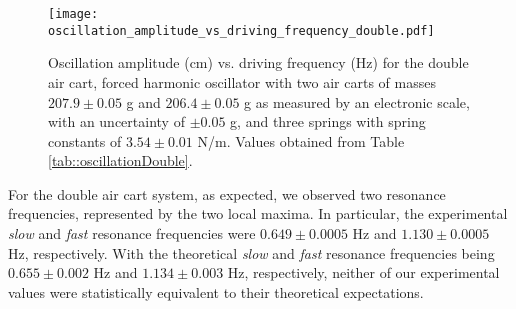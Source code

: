 \begin{figure}[H]
    \centering
	\texttt{[image: oscillation\_amplitude\_vs\_driving\_frequency\_double.pdf]}
	\label{fig::resonanceDouble}
	\caption{Oscillation amplitude (cm) vs. driving frequency (Hz) for the double air cart, forced harmonic oscillator with two air carts of masses $207.9 \pm 0.05$ g and $206.4 \pm 0.05$ g as measured by an electronic scale, with an uncertainty of $\pm 0.05$ g, and three springs with spring constants of $3.54 \pm 0.01$ N/m. Values obtained from Table \ref{tab::oscillationDouble}.}
\end{figure}

For the double air cart system, as expected, we observed two resonance frequencies, represented by the two local maxima. In particular, the experimental \textit{slow} and \textit{fast} resonance frequencies were $0.649 \pm 0.0005$ Hz and $1.130 \pm 0.0005$ Hz, respectively. With the theoretical \textit{slow} and \textit{fast} resonance frequencies being $0.655 \pm 0.002$ Hz and $1.134 \pm 0.003$ Hz, respectively, neither of our experimental values were statistically equivalent to their theoretical expectations.













